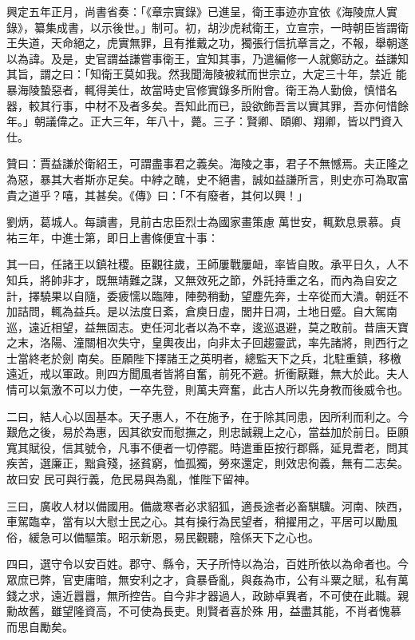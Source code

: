 \begin{pinyinscope}
 興定五年正月，尚書省奏：「《章宗實錄》已進呈，衛王事迹亦宜依《海陵庶人實錄》，纂集成書，以示後世。」制可。初，胡沙虎弒衛王，立宣宗，一時朝臣皆謂衛王失道，天命絕之，虎實無罪，且有推戴之功，獨張行信抗章言之，不報，舉朝遂以為諱。及是，史官謂益謙嘗事衛王，宜知其事，乃遣編修一人就鄭訪之。益謙知其旨，謂之曰：「知衛王莫如我。然我聞海陵被弒而世宗立，大定三十年，禁近
 能暴海陵蟄惡者，輒得美仕，故當時史官修實錄多所附會。衛王為人勤儉，慎惜名器，較其行事，中材不及者多矣。吾知此而已，設欲飾吾言以實其罪，吾亦何惜餘年。」朝議偉之。正大三年，年八十，薨。三子：賢卿、頤卿、翔卿，皆以門資入仕。



 贊曰：賈益謙於衛紹王，可謂盡事君之義矣。海陵之事，君子不無憾焉。夫正隆之為惡，暴其大者斯亦足矣。中綍之醜，史不絕書，誠如益謙所言，則史亦可為取富貴之道乎？嘻，其甚矣。《傳》曰：「不有廢者，其何以興！」



 劉炳，葛城人。每讀書，見前古忠臣烈士為國家畫策慮
 萬世安，輒歎息景慕。貞祐三年，中進士第，即日上書條便宜十事：



 其一曰，任諸王以鎮社稷。臣觀往歲，王師屢戰屢衄，率皆自敗。承平日久，人不知兵，將帥非才，既無靖難之謀，又無效死之節，外託持重之名，而內為自安之計，擇驍果以自隨，委疲懦以臨陣，陣勢稍動，望塵先奔，士卒從而大潰。朝廷不加詰問，輒為益兵。是以法度日紊，倉庾日虛，閭井日凋，土地日蹙。自大駕南巡，遠近相望，益無固志。吏任河北者以為不幸，逡巡退避，莫之敢前。昔唐天寶之末，洛陽、潼關相次失守，皇輿夜出，向非太子回趨靈武，率先諸將，則西行之士當終老於劍
 南矣。臣願陛下擇諸王之英明者，總監天下之兵，北駐重鎮，移檄遠近，戒以軍政。則四方聞風者皆將自奮，前死不避。折衝厭難，無大於此。夫人情可以氣激不可以力使，一卒先登，則萬夫齊奮，此古人所以先身教而後威令也。



 二曰，結人心以固基本。天子惠人，不在施予，在于除其同患，因所利而利之。今艱危之後，易於為惠，因其欲安而慰撫之，則忠誠親上之心，當益加於前日。臣願寬其賦役，信其號令，凡事不便者一切停罷。時遣重臣按行郡縣，延見耆老，問其疾苦，選廉正，黜貪殘，拯貧窮，恤孤獨，勞來還定，則效忠徇義，無有二志矣。故曰安
 民可與行義，危民易與為亂，惟陛下留神。



 三曰，廣收人材以備國用。備歲寒者必求貂狐，適長途者必畜騏驥。河南、陜西，車駕臨幸，當有以大慰士民之心。其有操行為民望者，稍擢用之，平居可以勵風俗，緩急可以備驅策。昭示新恩，易民觀聽，陰係天下之心也。



 四曰，選守令以安百姓。郡守、縣令，天子所恃以為治，百姓所依以為命者也。今眾庶已弊，官吏庸暗，無安利之才，貪暴昏亂，與姦為市，公有斗粟之賦，私有萬錢之求，遠近囂囂，無所控告。自今非才器過人，政跡卓異者，不可使在此職。親勳故舊，雖望隆資高，不可使為長吏。則賢者喜於殊
 用，益盡其能，不肖者愧慕而思自勵矣。




\end{pinyinscope}
